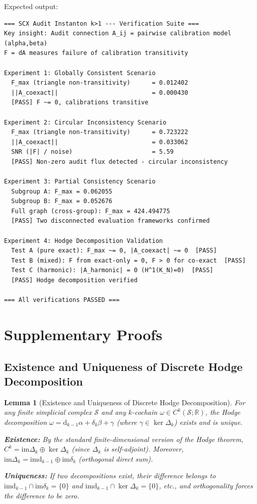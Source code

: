 \documentclass[12pt,a4paper]{article}
\theoremstyle{plain}
\newtheorem{lemma}[theorem]{Lemma}
\theoremstyle{definition}
\theoremstyle{remark}
\newcommand{\R}{\mathbb{R}}
\newcommand{\im}{\mathrm{im}}
\newcommand{\dd}{\mathrm{d}}
\newcommand{\SSS}{\mathcal{S}}
\begin{document}
Expected output:
\begin{verbatim}
=== SCX Audit Instanton k>1 --- Verification Suite ===
Key insight: Audit connection A_ij = pairwise calibration model (alpha,beta)
F = dA measures failure of calibration transitivity

Experiment 1: Globally Consistent Scenario
  F_max (triangle non-transitivity)      = 0.012402
  ||A_coexact||                          = 0.000430
  [PASS] F ~= 0, calibrations transitive

Experiment 2: Circular Inconsistency Scenario
  F_max (triangle non-transitivity)      = 0.723222
  ||A_coexact||                          = 0.033062
  SNR (|F| / noise)                      = 5.59
  [PASS] Non-zero audit flux detected - circular inconsistency

Experiment 3: Partial Consistency Scenario
  Subgroup A: F_max = 0.062055
  Subgroup B: F_max = 0.052676
  Full graph (cross-group): F_max = 424.494775
  [PASS] Two disconnected evaluation frameworks confirmed

Experiment 4: Hodge Decomposition Validation
  Test A (pure exact): F_max ~= 0, |A_coexact| ~= 0  [PASS]
  Test B (mixed): F from exact-only = 0, F > 0 for co-exact  [PASS]
  Test C (harmonic): |A_harmonic| = 0 (H^1(K_N)=0)  [PASS]
  [PASS] Hodge decomposition verified

=== All verifications PASSED ===
\end{verbatim}

\section{Supplementary Proofs}
\label{sec:supp_proofs}

\subsection{Existence and Uniqueness of Discrete Hodge Decomposition}
\label{sec:hodge_existence}

\begin{lemma}[Existence and Uniqueness of Discrete Hodge Decomposition]
\label{lem:hodge_unique}
For any finite simplicial complex $\SSS$ and any $k$-cochain $\omega \in C^k(\SSS; \R)$, the Hodge decomposition $\omega = \dd_{k-1}\alpha + \delta_k\beta + \gamma$ (where $\gamma \in \ker \Delta_k$) exists and is unique.

\noindent
\textbf{Existence:} By the standard finite-dimensional version of the Hodge theorem, $C^k = \im \Delta_k \oplus \ker \Delta_k$ (since $\Delta_k$ is self-adjoint). Moreover, $\im \Delta_k = \im \dd_{k-1} \oplus \im \delta_k$ (orthogonal direct sum).

\noindent
\textbf{Uniqueness:} If two decompositions exist, their difference belongs to $\im \dd_{k-1} \cap \im \delta_k = \{0\}$ and $\im \dd_{k-1} \cap \ker \Delta_k = \{0\}$, etc., and orthogonality forces the difference to be zero.
\end{lemma}
\end{document}
